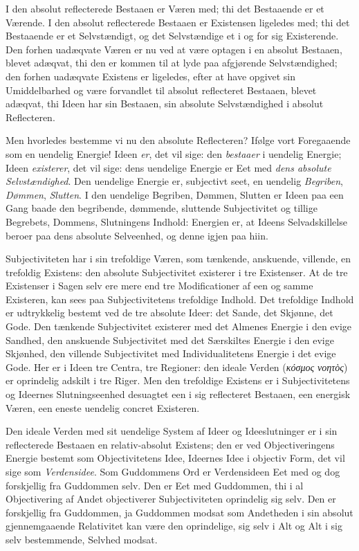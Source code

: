 \documentclass[12pt]{book}
\newcommand{\opage}[1]{\marginnote{\footnotesize\textit{[#1]}}}
\begin{document}
I den absolut reflecterede Bestaaen er Væren med; thi det Bestaaende er et Værende. I den absolut reflecterede Bestaaen er Existensen ligeledes med; thi det Bestaaende er et Selvstændigt, og det Selvstændige et i og for sig Existerende. Den forhen uadæqvate Væren er nu ved at være optagen i en absolut Bestaaen, blevet adæqvat, thi den er kommen til at lyde paa afgjørende Selvstændighed; den forhen uadæqvate Existens er ligeledes, efter at have opgivet sin Umiddelbarhed og være forvandlet til absolut reflecteret Bestaaen, blevet adæqvat, thi Ideen har sin Bestaaen, sin absolute Selvstændighed i absolut Reflecteren.

Men hvorledes bestemme vi nu den absolute Reflecteren? Ifølge vort Foregaaende som en uendelig Energie! Ideen \emph{er},
\opage{437}det vil sige: den \emph{bestaaer} i uendelig Energie; Ideen \emph{existerer}, det vil sige: dens uendelige Energie er Eet med \emph{dens absolute Selvstændighed}. Den uendelige Energie er, subjectivt seet, en uendelig \emph{Begriben}, \emph{Dømmen}, \emph{Slutten}. I den uendelige Begriben, Dømmen, Slutten er Ideen paa een Gang baade den begribende, dømmende, sluttende Subjectivitet og tillige Begrebets, Dommens, Slutningens Indhold: Energien er, at Ideens Selvadskillelse beroer paa dens absolute Selveenhed, og denne igjen paa hiin.

Subjectiviteten har i sin trefoldige Væren, som tænkende, anskuende, villende, en trefoldig Existens: den absolute Subjectivitet existerer i tre Existenser. At de tre Existenser i Sagen selv ere mere end tre Modificationer af een og samme Existeren, kan sees paa Subjectivitetens trefoldige Indhold. Det trefoldige Indhold er udtrykkelig bestemt ved de tre absolute Ideer: det Sande, det Skjønne, det Gode. Den tænkende Subjectivitet existerer med det Almenes Energie i den evige Sandhed, den anskuende Subjectivitet med det Særskiltes Energie i den evige Skjønhed, den villende Subjectivitet med Individualitetens Energie i det evige Gode. Her er i Ideen tre Centra, tre Regioner: den ideale Verden (\textit{κόσμος νοητὸς}) er oprindelig adskilt i tre Riger. Men den trefoldige Existens er i Subjectivitetens og Ideernes Slutningseenhed desuagtet een i sig reflecteret Bestaaen, een energisk Væren, een eneste uendelig concret Existeren.

Den ideale Verden med sit uendelige System af Ideer og Ideeslutninger er i sin reflecterede Bestaaen en relativ-absolut Existens; den er ved Objectiveringens Energie bestemt som Objectivitetens Idee, Ideernes Idee i objectiv Form, det vil sige som \emph{Verdensidee}. Som Guddommens Ord er Verdensideen Eet med og dog forskjellig fra Guddommen selv. Den er Eet med Guddommen, thi i al Objectivering af Andet objectiverer Subjectiviteten oprindelig sig selv. Den er forskjellig fra Guddommen, ja Guddommen modsat som
\opage{438}Andetheden i sin absolut gjennemgaaende Relativitet kan være den oprindelige, sig selv i Alt og Alt i sig selv bestemmende, Selvhed modsat.
\end{document}
